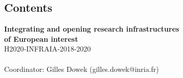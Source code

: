 \documentclass[12pt,noworkareas,deliverables,report,notecites,longtasklabels,submit\classoptions]{euproposal}
\begin{document}
\begin{proposal}
  \vfil\null\newpage
  \chapter*{Contents}

  \newpage

  
\newpage

\newpage


\proposalmiddle

  \thispagestyle{empty}
  \begin{center}
    {\Large\bf Integrating and opening research infrastructures\\of European interest}\\[10mm]

    {\LARGE H2020-INFRAIA-2018-2020}\\[10mm]

    \\[10mm]

    Coordinator: Gilles Dowek (gilles.dowek@inria.fr)\\[10mm]
  \end{center}

\newpage


\end{proposal}
\end{document}
